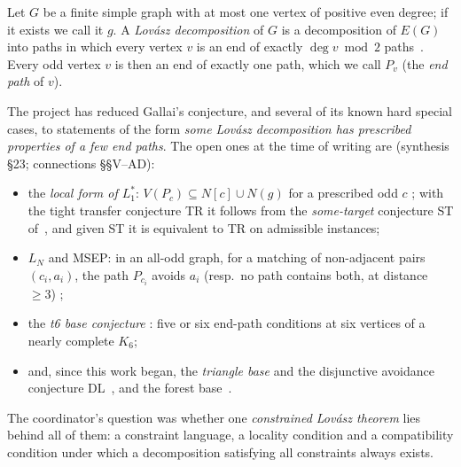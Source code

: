 \documentclass[11pt]{amsart}
\theoremstyle{definition}
\begin{document}
Let $G$ be a finite simple graph with at most one vertex of positive even degree; if it exists we
call it $g$. A \emph{Lov\'asz decomposition} of $G$ is a decomposition of $E(G)$ into paths in which
every vertex $v$ is an end of exactly $\deg v\bmod2$ paths~\cite{Lov68}. Every odd vertex $v$ is
then an end of exactly one path, which we call $P_v$ (the \emph{end path} of $v$).

The project has reduced Gallai's conjecture, and several of its known hard special cases, to
statements of the form \emph{some Lov\'asz decomposition has prescribed properties of a few end
paths}. The open ones at the time of writing are (synthesis \S23; connections \S\S V--AD):
\begin{itemize}
\item the \emph{local form of $L_1^*$}: $V(P_c)\subseteq N[c]\cup N(g)$ for a prescribed odd $c$
\cite{L1S}; with the tight transfer conjecture TR it follows from the \emph{some-target}
conjecture ST of~\cite{L1I}, and given ST it is equivalent to TR on admissible instances;
\item $L_N$ and MSEP: in an all-odd graph, for a matching of non-adjacent pairs $(c_i,a_i)$, the
path $P_{c_i}$ avoids $a_i$ (resp.\ no path contains both, at distance $\ge3$) \cite{RD,MS};
\item the \emph{t6 base conjecture} \cite[Conj.~5.1]{T6}: five or six end-path conditions at six
vertices of a nearly complete $K_6$;
\item and, since this work began, the \emph{triangle base} and the disjunctive avoidance conjecture
DL~\cite{DT}, and the forest base~\cite{DT}.
\end{itemize}
The coordinator's question was whether one \emph{constrained Lov\'asz theorem} lies behind all of
them: a constraint language, a locality condition and a compatibility condition under which a
decomposition satisfying all constraints always exists.
\end{document}
